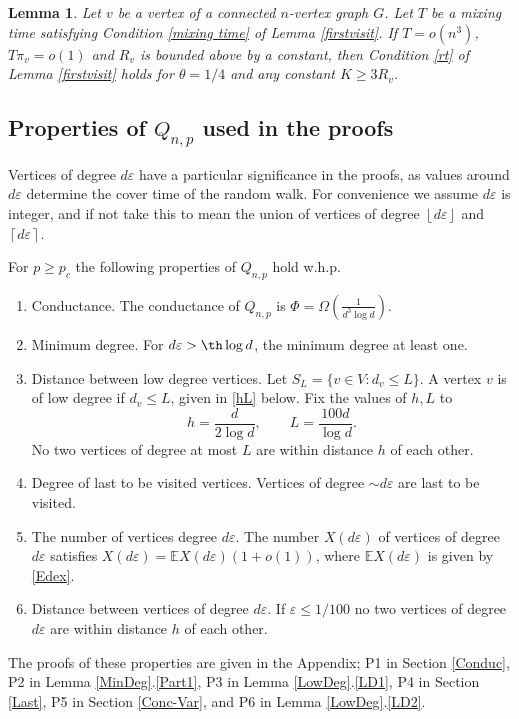 \documentclass[12pt]{article}
\def\e{\varepsilon} \def\f{\phi} \def\F{{\Phi}} \def\vp{\varphi} \def\g{\gamma}
\newtheorem{lemma}[theorem]{Lemma}
\newcommand{\ooi}{(1+o(1))}
\newcommand{\rdup}[1]{{\left\lceil #1\right\rceil }}
\newcommand{\rdown}[1]{{\left\lfloor #1\right \rfloor}}
\newcommand{\bfrac}[2]{\left(\frac{#1}{#2}\right)}
\def\E{\mathbb{E}}
\begin{document}
\begin{lemma}\label{helper}
 Let $v$ be a vertex of a connected $n$-vertex graph $G$. Let $T$ be a mixing time satisfying Condition \eqref{mixing time}
  of Lemma \ref{firstvisit}. If $T= o(n^3)$, $T\pi_v=o(1)$ and $R_v$ is bounded above by a constant, then Condition \eqref{rt} of Lemma \ref{firstvisit} holds for $\theta= 1/4$ and any constant $K \geq 3R_v$.
\end{lemma}

\subsection{Properties of $Q_{n,p}$ used in the proofs}

Vertices of degree $d\e$ have a particular significance in the proofs, as values around $d\e$ determine the cover time of the random walk.
For convenience we assume $d\e$ is integer, and if not take this to mean the union of vertices of degree $\rdown{d\e}$ and $\rdup{d\e}$.

For $p \ge p_c$ the following  properties of $Q_{n,p}$ hold w.h.p.
\begin{enumerate}[P1.]
\item {\sc Conductance.} \label{P1} The conductance of $Q_{n,p}$ is
$
\F=\Omega\bfrac{1}{d^3\log d}$.


\item {\sc Minimum degree.}  \label{P2}
For
$d\e> \th \log d$, the minimum degree at least one.


\item {\sc Distance between low degree vertices.}
 \label{P3} Let $S_L=\{v \in V: d_v \le L\}$. A vertex $v$ is of low degree if $d_v \le L$, given in \eqref{hL} below.
  Fix the values of $h,L$ to
\begin{equation}\label{hL}
h= \frac{d}{2 \log d}, \qquad L=  \frac {100d}{\log d}.
\end{equation}
No two vertices of degree at most $L$ are within distance $h$ of each other.\\


\item  {\sc Degree of last to be visited vertices.} \label{P4}
 Vertices of degree $\sim d\e$ are last  to be visited.  %

\item \label{P5} {\sc The number of vertices degree $d\e$.} The number $X(d\e)$ of vertices of degree $d\e$ satisfies $X(d\e)=\E X(d\e) \ooi$, where $\E X(d\e)$ is given by \eqref{Edex}.

\item {\sc Distance between vertices of degree $d\e$.} \label{P6} If $\e \le 1/100$ no two vertices of degree $d\e$ are within distance $h$ of each other.
\end{enumerate}
The proofs of these properties are given in the Appendix;
P1 in Section \ref{Conduc}, P2 in Lemma \ref{MinDeg}.\ref{Part1},
P3 in  Lemma \ref{LowDeg}.\ref{LD1}, P4 in  Section \ref{Last}, P5 in  Section \ref{Conc-Var}, and
P6 in Lemma \ref{LowDeg}.\ref{LD2}.
\end{document}
